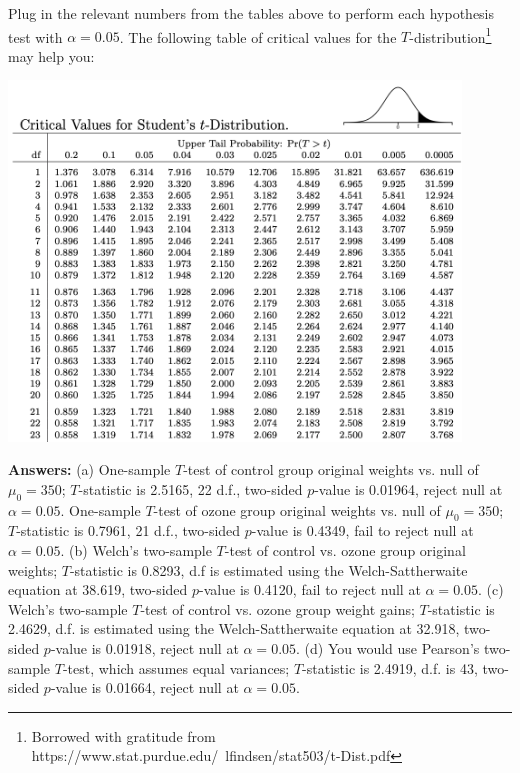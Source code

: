 \begin{question}{}
\noindent Plug in the relevant numbers from the tables above to perform each hypothesis test with $\alpha = 0.05$. The following table of critical values for the $T$-distribution\footnote{Borrowed with gratitude from https://www.stat.purdue.edu/~lfindsen/stat503/t-Dist.pdf} may help you:

\begin{center}
\includegraphics[width=0.9\textwidth]{img/t-distribution-critical-values.png}
\end{center}

\noindent \textbf{Answers:} (a) One-sample $T$-test of control group original weights vs. null of $\mu_0 = 350$; $T$-statistic is 2.5165, 22 d.f., two-sided $p$-value is 0.01964, reject null at $\alpha=0.05$. One-sample $T$-test of ozone group original weights vs. null of $\mu_0 = 350$; $T$-statistic is 0.7961, 21 d.f., two-sided $p$-value is 0.4349, fail to reject null at $\alpha=0.05$. (b) Welch's two-sample $T$-test of control vs. ozone group original weights; $T$-statistic is 0.8293, d.f is estimated using the Welch-Sattherwaite equation at 38.619, two-sided $p$-value is 0.4120, fail to reject null at $\alpha=0.05$. (c) Welch's two-sample $T$-test of control vs. ozone group weight gains; $T$-statistic is 2.4629, d.f. is estimated using the Welch-Sattherwaite equation at 32.918, two-sided $p$-value is 0.01918, reject null at $\alpha=0.05$. (d) You would use Pearson's two-sample $T$-test, which assumes equal variances; $T$-statistic is 2.4919, d.f. is 43, two-sided $p$-value is 0.01664, reject null at $\alpha=0.05$. 

\end{question}
